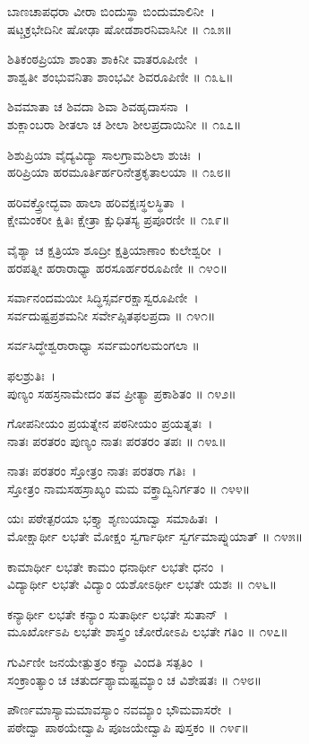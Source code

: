 ಬಾಣಚಾಪಧರಾ ವೀರಾ ಬಿಂದುಸ್ಥಾ ಬಿಂದುಮಾಲಿನೀ~।\\
ಷಟ್ಚಕ್ರಭೇದಿನೀ ಷೋಢಾ ಷೋಡಶಾರನಿವಾಸಿನೀ ॥ ೧೩೫॥

ಶಿತಿಕಂಠಪ್ರಿಯಾ ಶಾಂತಾ ಶಾಕಿನೀ ವಾತರೂಪಿಣೀ~।\\
ಶಾಶ್ವತೀ ಶಂಭುವನಿತಾ ಶಾಂಭವೀ ಶಿವರೂಪಿಣೀ ॥ ೧೩೬॥

ಶಿವಮಾತಾ ಚ ಶಿವದಾ ಶಿವಾ ಶಿವಹೃದಾಸನಾ~।\\
ಶುಕ್ಲಾಂಬರಾ ಶೀತಲಾ ಚ ಶೀಲಾ ಶೀಲಪ್ರದಾಯಿನೀ ॥ ೧೩೭॥

ಶಿಶುಪ್ರಿಯಾ ವೈದ್ಯವಿದ್ಯಾ ಸಾಲಗ್ರಾಮಶಿಲಾ ಶುಚಿಃ~।\\
ಹರಿಪ್ರಿಯಾ ಹರಮೂರ್ತಿರ್ಹರಿನೇತ್ರಕೃತಾಲಯಾ ॥ ೧೩೮॥

ಹರಿವಕ್ತ್ರೋದ್ಭವಾ ಹಾಲಾ ಹರಿವಕ್ಷಃಸ್ಥಲಸ್ಥಿತಾ~।\\
ಕ್ಷೇಮಂಕರೀ ಕ್ಷಿತಿಃ ಕ್ಷೇತ್ರಾ ಕ್ಷುಧಿತಸ್ಯ ಪ್ರಪೂರಣೀ ॥ ೧೩೯॥

ವೈಶ್ಯಾ ಚ ಕ್ಷತ್ರಿಯಾ ಶೂದ್ರೀ ಕ್ಷತ್ರಿಯಾಣಾಂ ಕುಲೇಶ್ವರೀ~।\\
ಹರಪತ್ನೀ ಹರಾರಾಧ್ಯಾ ಹರಸೂರ್ಹರರೂಪಿಣೀ ॥ ೧೪೦॥

ಸರ್ವಾನಂದಮಯೀ ಸಿದ್ಧಿಸ್ಸರ್ವರಕ್ಷಾಸ್ವರೂಪಿಣೀ~।\\
ಸರ್ವದುಷ್ಟಪ್ರಶಮನೀ ಸರ್ವೇಪ್ಸಿತಫಲಪ್ರದಾ ॥ ೧೪೧॥

ಸರ್ವಸಿದ್ಧೇಶ್ವರಾರಾಧ್ಯಾ ಸರ್ವಮಂಗಲಮಂಗಲಾ ॥

ಫಲಶ್ರುತಿಃ~।\\
ಪುಣ್ಯಂ ಸಹಸ್ರನಾಮೇದಂ ತವ ಪ್ರೀತ್ಯಾ ಪ್ರಕಾಶಿತಂ ॥ ೧೪೨॥

ಗೋಪನೀಯಂ ಪ್ರಯತ್ನೇನ ಪಠನೀಯಂ ಪ್ರಯತ್ನತಃ~।\\
ನಾತಃ ಪರತರಂ ಪುಣ್ಯಂ ನಾತಃ ಪರತರಂ ತಪಃ ॥ ೧೪೩॥

ನಾತಃ ಪರತರಂ ಸ್ತೋತ್ರಂ ನಾತಃ ಪರತರಾ ಗತಿಃ~।\\
ಸ್ತೋತ್ರಂ ನಾಮಸಹಸ್ರಾಖ್ಯಂ ಮಮ ವಕ್ತ್ರಾದ್ವಿನಿರ್ಗತಂ ॥ ೧೪೪॥

ಯಃ ಪಠೇತ್ಪರಯಾ ಭಕ್ತ್ಯಾ ಶೃಣುಯಾದ್ವಾ ಸಮಾಹಿತಃ~।\\
ಮೋಕ್ಷಾರ್ಥೀ ಲಭತೇ ಮೋಕ್ಷಂ ಸ್ವರ್ಗಾರ್ಥೀ ಸ್ವರ್ಗಮಾಪ್ನುಯಾತ್ ॥ ೧೪೫॥

ಕಾಮಾರ್ಥೀ ಲಭತೇ ಕಾಮಂ ಧನಾರ್ಥೀ ಲಭತೇ ಧನಂ~।\\
ವಿದ್ಯಾರ್ಥೀ ಲಭತೇ ವಿದ್ಯಾಂ ಯಶೋಽರ್ಥೀ ಲಭತೇ ಯಶಃ ॥ ೧೪೬॥

ಕನ್ಯಾರ್ಥೀ ಲಭತೇ ಕನ್ಯಾಂ ಸುತಾರ್ಥೀ ಲಭತೇ ಸುತಾನ್~।\\
ಮೂರ್ಖೋಽಪಿ ಲಭತೇ ಶಾಸ್ತ್ರಂ ಚೋರೋಽಪಿ ಲಭತೇ ಗತಿಂ ॥ ೧೪೭॥

ಗುರ್ವಿಣೀ ಜನಯೇತ್ಪುತ್ರಂ ಕನ್ಯಾ ವಿಂದತಿ ಸತ್ಪತಿಂ~।\\
ಸಂಕ್ರಾಂತ್ಯಾಂ ಚ ಚತುರ್ದಶ್ಯಾಮಷ್ಟಮ್ಯಾಂ ಚ ವಿಶೇಷತಃ ॥ ೧೪೮॥

ಪೌರ್ಣಮಾಸ್ಯಾಮಮಾವಸ್ಯಾಂ ನವಮ್ಯಾಂ ಭೌಮವಾಸರೇ~।\\
ಪಠೇದ್ವಾ ಪಾಠಯೇದ್ವಾಪಿ ಪೂಜಯೇದ್ವಾಪಿ ಪುಸ್ತಕಂ ॥ ೧೪೯॥

